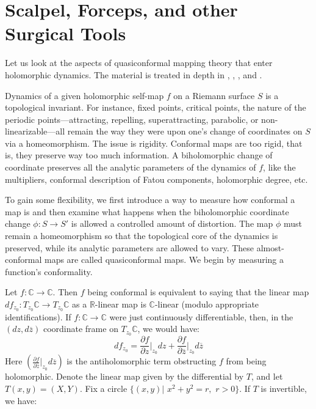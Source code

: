 \documentclass[11pt,a4paper]{article}
\begin{document}
\section*{Scalpel, Forceps, and other Surgical Tools}



        Let us look at the aspects of quasiconformal mapping theory that enter holomorphic dynamics. The material is treated in depth in \cite{ahlfors2006lectures}, \cite{branner2014quasiconformal}, \cite{hubbard2016teichmuller}, and \cite{imayoshi2012introduction}.

        Dynamics of a given holomorphic self-map $f$ on a Riemann surface $S$ is a topological invariant. For instance, fixed points, critical points, the nature of the periodic points---attracting, repelling, superattracting, parabolic, or non-linearizable---all remain the way they were upon one's change of coordinates on $S$ via a homeomorphism. The issue is rigidity. Conformal maps are too rigid, that is, they preserve way too much information. A biholomorphic change of coordinate preserves all the analytic parameters of the dynamics of $f$, like the multipliers, conformal description of Fatou components, holomorphic degree, etc.

        To gain some flexibility, we first introduce a way to measure how conformal a map is and then examine what happens when the biholomorphic coordinate change $\phi:S\to S'$ is allowed a controlled amount of distortion. The map $\phi$ must remain a homeomorphism so that the topological core of the dynamics is preserved, while its analytic parameters are allowed to vary. These almost-conformal maps are called quasiconformal maps. We begin by measuring a function's conformality.

        Let $f: \mathbb{C} \rightarrow \mathbb{C}$. Then $f$ being conformal is equivalent to saying that the linear map $df_{z_0}: T_{z_0}\mathbb{C} \rightarrow T_{z_0}\mathbb{C}$ as a $\mathbb{R}$-linear map is $\mathbb{C}$-linear (modulo appropriate identifications). If $f: \mathbb{C} \rightarrow \mathbb{C}$ were just continuously differentiable, then, in the $(dz, d\overline{z})$ coordinate frame on $T_{z_0}\mathbb{C}$, we would have:
        $$df_{z_0} = {\frac{\partial f}{\partial z}}\bigg|_{z_0}dz + {\frac{\partial f}{\partial \overline{z}}}\bigg|_{z_0}d\overline{z}$$
        Here $\left({\frac{\partial f}{\partial \overline{z}}}\bigg|_{z_0}d\overline{z}\right)$ is the antiholomorphic term obstructing $f$ from being holomorphic. Denote the linear map given by the differential by $T$, and let $T(x, y) = (X, Y)$. Fix a circle $\{(x, y)|$ $x^2 + y^2 = r,$ $r>0\}$. If $T$ is invertible, we have:
\end{document}
